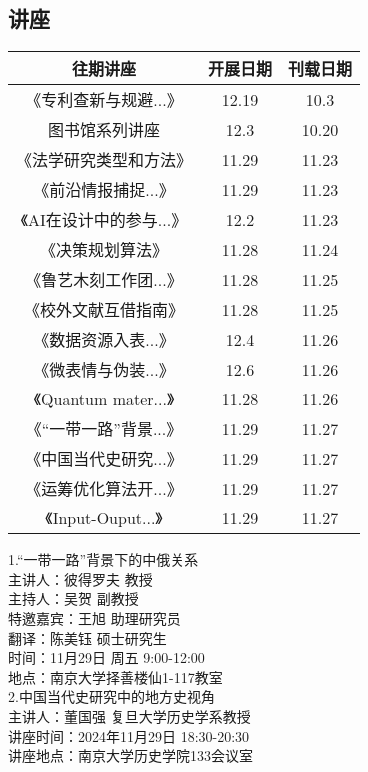 \documentclass[letterpaper, 12pt]{article}
\begin{document}
\begin{multicols}{2}

\section{讲座}
\begin{tabular}{|c|c|c|}
    \hline
    往期讲座 & 开展日期 & 刊载日期\\
    \hline\hline
    《专利查新与规避...》 & 12.19 & 10.3\\
    图书馆系列讲座 & 12.3 & 10.20\\
    《法学研究类型和方法》 & 11.29 & 11.23\\
    《前沿情报捕捉...》 & 11.29 & 11.23\\
    《AI在设计中的参与...》 & 12.2 & 11.23\\
    《决策规划算法》 & 11.28 & 11.24\\
    《鲁艺木刻工作团...》 & 11.28 & 11.25\\
    《校外文献互借指南》 & 11.28 & 11.25\\
    《数据资源入表...》 & 12.4 & 11.26\\
    《微表情与伪装...》 & 12.6 & 11.26\\
    《Quantum mater...》 & 11.28 & 11.26\\
    《“一带一路”背景...》& 11.29 & 11.27\\
    《中国当代史研究...》& 11.29 & 11.27\\
    《运筹优化算法开...》 & 11.29 & 11.27\\
    《Input-Ouput...》 & 11.29 & 11.27\\
    \hline
\end{tabular}

1.“一带一路”背景下的中俄关系\\
主讲人：彼得罗夫 教授\\
主持人：吴贺 副教授\\
特邀嘉宾：王旭 助理研究员\\
翻译：陈美钰 硕士研究生\\
时间：11月29日 周五 9:00-12:00\\
地点：南京大学择善楼仙1-117教室\\

2.中国当代史研究中的地方史视角\\
主讲人：董国强  复旦大学历史学系教授\\
讲座时间：2024年11月29日 18:30-20:30\\
讲座地点：南京大学历史学院133会议室 \\


\end{multicols}
\end{document}
